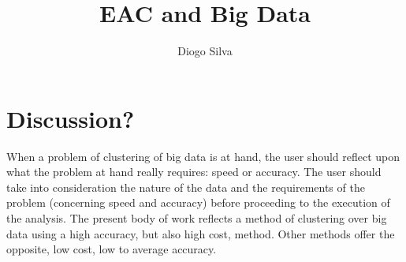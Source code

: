 \documentclass[10pt,a4paper,final]{article}
\author{Diogo Silva}
\title{EAC and Big Data}
\begin{document}
\onehalfspacing %



\tableofcontents

\printglossary[type=\acronymtype,title=Abbreviations]









\section{Discussion?}

When a problem of clustering of big data is at hand, the user should reflect upon what the problem at hand really requires: speed or accuracy. The user should take into consideration the nature of the data and the requirements of the problem (concerning speed and accuracy) before proceeding to the execution of the analysis. The present body of work reflects a method of clustering over big data using a high accuracy, but also high cost, method. Other methods offer the opposite, low cost, low to average accuracy. 



\end{document}
